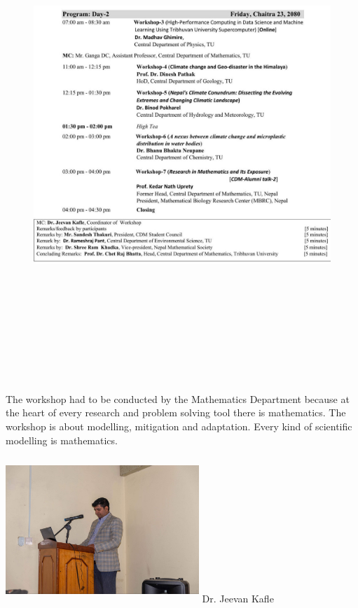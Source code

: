 \documentclass[a4paper,12pt]{report}
\begin{document}
\begin{figure}[h!]
  \centering
  \includegraphics[width=17.5cm, height=18.5cm]{p2.jpg}
\end{figure}

\begin{minipage}{0.45\textwidth}
  The workshop had to be conducted by the Mathematics Department because at the heart of every research and problem solving tool there is mathematics. The workshop is about modelling, mitigation and adaptation. Every kind of scientific modelling is mathematics.
\end{minipage} \hspace{5mm}
\begin{minipage}{0.41\textwidth}
  \includegraphics[width=7.3cm, height=5.5cm]{jeevan.jpeg}
 \hspace*{5mm} Dr. Jeevan Kafle
 \end{minipage}
 \clearpage
\end{document}
